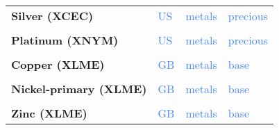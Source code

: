 \documentclass[
  authoryear,
  preprint,
  3p]{elsarticle}
\begin{document}
\begin{longtable}[t]{>{}l>{}l>{}l>{}l}
\textbf{Silver (XCEC)} & \textcolor[HTML]{4285f4}{US} & \textcolor[HTML]{4285f4}{metals} & \textcolor[HTML]{4285f4}{precious}\\
\textbf{\cellcolor{gray!10}{Palladium (XNYM)}} & \textcolor[HTML]{4285f4}{\cellcolor{gray!10}{US}} & \textcolor[HTML]{4285f4}{\cellcolor{gray!10}{metals}} & \textcolor[HTML]{4285f4}{\cellcolor{gray!10}{precious}}\\
\textbf{Platinum (XNYM)} & \textcolor[HTML]{4285f4}{US} & \textcolor[HTML]{4285f4}{metals} & \textcolor[HTML]{4285f4}{precious}\\
\textbf{\cellcolor{gray!10}{Aluminium (XLME)}} & \textcolor[HTML]{4285f4}{\cellcolor{gray!10}{GB}} & \textcolor[HTML]{4285f4}{\cellcolor{gray!10}{metals}} & \textcolor[HTML]{4285f4}{\cellcolor{gray!10}{base}}\\
\addlinespace
\textbf{Copper (XLME)} & \textcolor[HTML]{4285f4}{GB} & \textcolor[HTML]{4285f4}{metals} & \textcolor[HTML]{4285f4}{base}\\
\textbf{\cellcolor{gray!10}{Lead (XLME)}} & \textcolor[HTML]{4285f4}{\cellcolor{gray!10}{GB}} & \textcolor[HTML]{4285f4}{\cellcolor{gray!10}{metals}} & \textcolor[HTML]{4285f4}{\cellcolor{gray!10}{base}}\\
\textbf{Nickel-primary (XLME)} & \textcolor[HTML]{4285f4}{GB} & \textcolor[HTML]{4285f4}{metals} & \textcolor[HTML]{4285f4}{base}\\
\textbf{\cellcolor{gray!10}{Tin-refined (XLME)}} & \textcolor[HTML]{4285f4}{\cellcolor{gray!10}{GB}} & \textcolor[HTML]{4285f4}{\cellcolor{gray!10}{metals}} & \textcolor[HTML]{4285f4}{\cellcolor{gray!10}{base}}\\
\textbf{Zinc (XLME)} & \textcolor[HTML]{4285f4}{GB} & \textcolor[HTML]{4285f4}{metals} & \textcolor[HTML]{4285f4}{base}\\
\bottomrule

\end{longtable}

\endgroup{}

\newpage


\renewcommand\refname{References}
  
\end{document}
